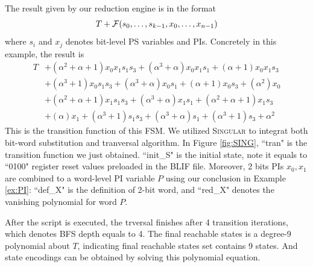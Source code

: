 \begin{Example}
The result given by our reduction engine is in the format 
$$T+{\mathcal{F}}(s_0,\dots,s_{k-1},x_0,\dots,x_{n-1})$$ 
where $s_i$ and $x_j$ denotes bit-level PS variables and PIs. Concretely in this example, the result is
\begin{align*}
T&+(\alpha^2+\alpha+1) x_0 x_1 s_1 s_3+(\alpha^3+\alpha) x_0 x_1 s_1+(\alpha+1) x_0 x_1 s_3 \\
&+(\alpha^3+1) x_0 s_1 s_3+(\alpha^3+\alpha) x_0 s_1 +(\alpha+1) x_0 s_3+(\alpha^2) x_0 \\
&+(\alpha^2+\alpha+1) x_1 s_1 s_3+(\alpha^3+\alpha) x_1 s_1+(\alpha^2+\alpha+1) x_1 s_3\\
&+(\alpha) x_1+(\alpha^3+1) s_1 s_3+(\alpha^3+\alpha) s_1+(\alpha^3+1) s_3+\alpha^2
\end{align*}
This is the transition function of this FSM. We utilized \textsc{Singular} to integrat both 
bit-word substitution and tranversal algorithm. In Figure \ref{fig:SING}, ``tran" is the transition
function we just obtained. ``init\_S" is the initial state, note it equals to ``0100" register 
reset values preloaded in the BLIF file. Moreover, 2 bits PIs $x_0,x_1$ are combined to a word-level 
PI variable $P$ using our conclusion in Example \ref{ex:PI}: ``def\_X" is the definition of 2-bit 
word, and ``red\_X" denotes the vanishing polynomial for word $P$.


After the script is executed, the trversal finishes after 4 
transition iterations, which denotes BFS depth equals to 4. The final reachable states 
is a degree-9 polynomial about $T$, indicating final reachable states set contains 9 states.
And state encodings can be obtained by solving this polynomial equation.


\end{Example}
